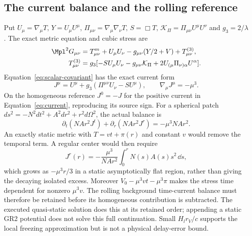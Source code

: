\subsection{The current balance and the rolling reference}
Put $U_\mu=\nabla_\mu T$, $Y=U_\mu U^\mu$,
$\Pi_{\mu\nu}=\nabla_\mu\nabla_\nu T$, $S=\Box T$,
$\mathcal K_\Pi=\Pi_{\mu\nu}U^\mu U^\nu$ and $g_3=2/\lambda$.
The exact metric equation and cubic stress are
\begin{align}
 \Mpl^2G_{\mu\nu}&=T^m_{\mu\nu}+U_\mu U_\nu
             -g_{\mu\nu}(Y/2+V)+T^{(3)}_{\mu\nu},\nonumber\\
 T^{(3)}_{\mu\nu}&=g_3[-S U_\mu U_\nu-g_{\mu\nu}\mathcal K_\Pi
       +2U_{(\mu}\Pi_{\nu)\alpha}U^\alpha].
 \label{eq:continuation-einstein}
\end{align}
Equation~\eqref{eq:scalar-covariant} has the exact current form
\begin{equation}
 J^\mu=U^\mu+g_3(\Pi^{\mu\nu}U_\nu-SU^\mu),\qquad
 \nabla_\mu J^\mu=-\mu^3.
 \label{eq:continuation-current}
\end{equation}
On the homogeneous reference $J^0=-J$ for the positive current in
Equation~\eqref{eq:current}, reproducing its source sign.
For a spherical patch
$ds^2=-N^2dt^2+A^2dr^2+r^2d\Omega^2$, the actual balance is
\begin{equation}
 \partial_t(NAr^2J^t)+\partial_r(NAr^2J^r)=-\mu^3NAr^2.
 \label{eq:continuation-balance}
\end{equation}
An exactly static metric with $T=vt+\pi(r)$ and constant $v$ would remove
the temporal term. A regular center would then require
\begin{equation}
 J^r(r)=-\frac{\mu^3}{NAr^2}\int_0^rN(s)A(s)s^2\,\dd s,
 \label{eq:continuation-static}
\end{equation}
which grows as $-\mu^3r/3$ in a static asymptotically flat region, rather
than giving the decaying isolated excess. Moreover $V_0-\mu^3vt-\mu^3\pi$
makes the stress time dependent for nonzero $\mu^3v$. The rolling
background time-current balance must therefore be retained before its
homogeneous contribution is subtracted. The executed quasi-static
solution does this at its retained order; appending a static GR2 potential
does not solve this full continuation. Small $H_lr_V/c$ supports the
local freezing approximation but is not a physical delay-error bound.


